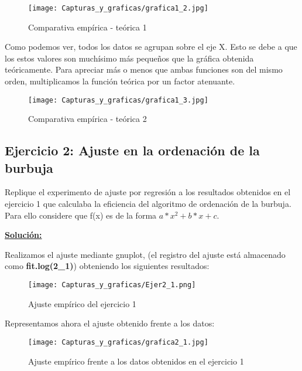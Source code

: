 \documentclass[11pt,a4paper]{article}
\begin{document}
\begin{figure}[H]
	\centering
	\texttt{[image: Capturas\_y\_graficas/grafica1\_2.jpg]}
	\caption{Comparativa empírica - teórica 1}
\end{figure}

Como podemos ver, todos los datos se agrupan sobre el eje X. Esto se debe a que los estos valores son muchísimo más pequeños que la gráfica obtenida teóricamente. Para apreciar más o menos que ambas funciones son del mismo orden, multiplicamos la función teórica por un factor atenuante.

\begin{figure}[H]
	\centering
	\texttt{[image: Capturas\_y\_graficas/grafica1\_3.jpg]}
	\caption{Comparativa empírica - teórica 2}
\end{figure}

\subsection{Ejercicio 2: Ajuste en la ordenación de la burbuja}
Replique el experimento de ajuste por regresión a los resultados obtenidos en el ejercicio 1 que calculaba la eficiencia del algoritmo de ordenación de la burbuja. Para ello considere que f(x) es de la forma $a*x^2 + b*x + c$. \\

\newpage

\textbf{\underline{Solución:}}

Realizamos el ajuste mediante gnuplot, (el registro del ajuste está almacenado como \textbf{fit.log(2\_1)}) obteniendo los siguientes resultados:

\begin{figure}[H]
	\centering
	\texttt{[image: Capturas\_y\_graficas/Ejer2\_1.png]}
	\caption{Ajuste empírico del ejercicio 1}
\end{figure}

Representamos ahora el ajuste obtenido frente a los datos:

\begin{figure}[H]
	\centering
	\texttt{[image: Capturas\_y\_graficas/grafica2\_1.jpg]}
	\caption{Ajuste empírico frente a los datos obtenidos en el ejercicio 1}
\end{figure}
\end{document}
